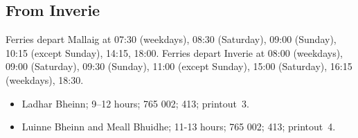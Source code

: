 \documentclass[12pt,a4paper]{article}
\begin{document}


\subsection*{From Inverie}

Ferries depart Mallaig at 07:30 (weekdays), 08:30 (Saturday), 09:00 (Sunday),
10:15 (except Sunday), 14:15, 18:00.  Ferries depart Inverie at 08:00
(weekdays), 09:00 (Saturday), 09:30 (Sunday), 11:00 (except Sunday), 15:00
(Saturday), 16:15 (weekdays), 18:30.

\begin{itemize}
\item Ladhar Bheinn; 9--12 hours; 765 002; 413; printout~3.

\item Luinne Bheinn and Meall Bhuidhe; 11-13 hours; 765 002; 413; printout~4.
\end{itemize}







\end{document}
